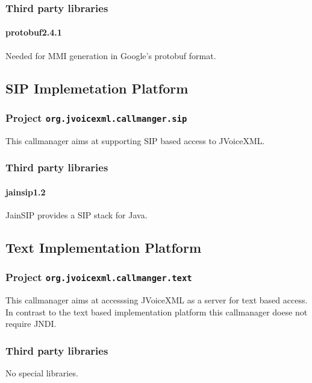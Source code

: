 \documentclass[11pt,a4paper]{article}
\begin{document}
\subsubsection{Third party libraries}

\paragraph{protobuf2.4.1}

Needed for MMI generation in Google's protobuf format.

\subsection{SIP Implemetation Platform}
\subsubsection{Project \texttt{org.jvoicexml.callmanger.sip}}

This callmanager aims at supporting SIP based access to JVoiceXML.

\subsubsection{Third party libraries}

\paragraph{jainsip1.2}

JainSIP provides a SIP stack for Java.

\subsection{Text Implementation Platform}
\subsubsection{Project \texttt{org.jvoicexml.callmanger.text}}

This callmanager aims at accesssing JVoiceXML as a server for text based
access. In contrast to the text based implementation platform this callmanager
doese not require JNDI.

\subsubsection{Third party libraries}

No special libraries.
\end{document}
